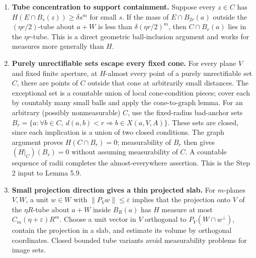\begin{enumerate}
neither. A reusable distance/projection identity and a convergent-subsequence
lemma for fixed-rank projections supply the geometric step. Thus finiteness
is retained explicitly at the good-set closedness interface, and no hidden
measurability assumption is needed.
For compact uniformization at finitely many apertures, take their finite
intersection at the common index $N$, using lower constant and radius cutoff
$1/(N+1)$. These measurable sets increase with $N$, and their union covers
the weakly approximable points. Continuity from above makes the measure of
the residual set small; inner regularity then selects a compact subset of
one stage. This is separated as a generic lemma for finite regular Borel
measures on Hausdorff spaces, and applies even to an empty aperture family.


\item \textbf{Tube concentration to support containment.}
Suppose every $z\in C$ has $H(E\cap B_s(z))\geq\delta s^m$ for small $s$.
If the mass of $E\cap B_{2r}(a)$ outside the $(\eta r/2)$-tube about $a+W$
is less than $\delta(\eta r/2)^m$, then
$C\cap B_r(a)$ lies in the $\eta r$-tube. This is a direct geometric
ball-inclusion argument and works for measures more generally than $H$.

\item \textbf{Purely unrectifiable sets escape every fixed cone.}
For every plane $V$ and fixed finite aperture, at $H$-almost every point of a
purely unrectifiable set $C$, there are points of $C$ outside that cone at
arbitrarily small distances. The exceptional set is a countable union of
local cone-condition pieces; cover each by countably many small balls and
apply the cone-to-graph lemma. For an arbitrary (possibly nonmeasurable) $C$,
use the fixed-radius bad-anchor sets
$B_r=\{a:\forall b\in C,\ d(a,b)<r\Rightarrow b\in X(a,V,A)\}$.
These sets are closed, since each implication is a union of two closed
conditions. The graph argument proves $H(C\cap B_r)=0$; measurability of
$B_r$ then gives $(H|_C)(B_r)=0$ without assuming measurability of $C$.
A countable sequence of radii completes the almost-everywhere assertion.
This is the Step 2 input to Lemma 5.9.

\item \textbf{Small projection direction gives a thin projected slab.}
For $m$-planes $V,W$, a unit $w\in W$ with $\|P_Vw\|\leq\varepsilon$
implies that the projection onto $V$ of the $\eta R$-tube about $a+W$ inside
$B_R(a)$ has $H$ measure at most $C_m(\eta+\varepsilon)R^m$.
Choose a unit vector in $V$ orthogonal to $P_V(W\cap w^\perp)$, contain the
projection in a slab, and estimate its volume by orthogonal coordinates.
Closed bounded tube variants avoid measurability problems for image sets.


\end{enumerate}
